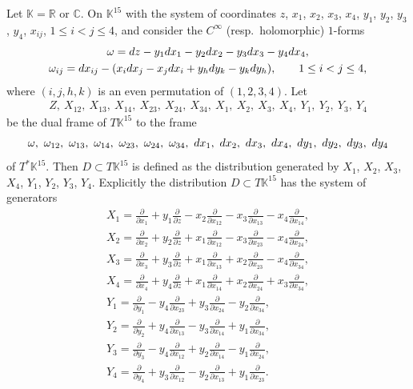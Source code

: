 \documentclass[11pt]{article}
\numberwithin{equation}{section}
\numberwithin{equation}{section}
\theoremstyle{definition}
\newcommand{\R}{\mathbb{R}}
\newcommand{\C}{\mathbb{C}}
\newcommand{\KK}{\mathbb{K}}
\newcommand{\0}{\boldsymbol{0}}
\newcommand{\pa}{\partial}
\begin{document}
Let $\KK = \R$ or $\C$.
On $\KK^{15}$ with the system of coordinates
$z$, $x_1$, $x_2$, $x_3$, $x_4$, $y_1$, $y_2$, $y_3$, $y_4$, $x_{ij}$, $1 \leq i < j \leq 4$, and consider the $C^\infty$ (resp.\ holomorphic) $1$-forms
\begin{gather*}
\omega = {\rm d}z - y_1{\rm d}x_1 - y_2{\rm d}x_2 - y_3{\rm d}x_3 - y_4{\rm d}x_4,
\\
\omega_{ij} =
{\rm d}x_{ij} - (x_i{\rm d}x_j - x_j{\rm d}x_i + y_h{\rm d}y_k - y_k{\rm d}y_h), \qquad 1 \leq i < j \leq 4,
\end{gather*}
where $(i, j, h, k)$ is an even permutation of $(1, 2, 3, 4)$.
Let
\begin{gather*}
Z,\ X_{12},\ X_{13},\ X_{14},\ X_{23},\ X_{24},\ X_{34},\ X_1,\ X_2,\ X_3,\ X_4,\ Y_1,\ Y_2,\ Y_3,\ Y_4
\end{gather*}
be the dual frame of $T\KK^{15}$ to the frame
\[
\omega,\ \omega_{12},\ \omega_{13},\ \omega_{14},\ \omega_{23},\ \omega_{24},\ \omega_{34},\
{\rm d}x_1,\ {\rm d}x_2,\ {\rm d}x_3,\ {\rm d}x_4,\ {\rm d}y_1,\ {\rm d}y_2,\ {\rm d}y_3,\ {\rm d}y_4
\]
of $T^*\KK^{15}$.
Then $D \subset T\KK^{15}$ is defined as the distribution generated by $X_1$, $X_2$, $X_3$, $X_4$, $Y_1$, $Y_2$, $Y_3$, $Y_4$.
Explicitly the distribution $D \subset T\KK^{15}$ has the system of generators
\begin{gather*}
X_1 = \frac{\pa}{\pa x_1} + y_1\frac{\pa}{\pa z} - x_2\frac{\pa}{\pa x_{12}} - x_3\frac{\pa}{\pa x_{13}} -
x_4\frac{\pa}{\pa x_{14}},
\\
X_2 = \frac{\pa}{\pa x_2} + y_2\frac{\pa}{\pa z} + x_1\frac{\pa}{\pa x_{12}} - x_3\frac{\pa}{\pa x_{23}} -
x_4\frac{\pa}{\pa x_{24}},
\\
X_3 = \frac{\pa}{\pa x_3} + y_3\frac{\pa}{\pa z} + x_1\frac{\pa}{\pa x_{13}} + x_2\frac{\pa}{\pa x_{23}} -
x_4\frac{\pa}{\pa x_{34}},
\\
X_4 = \frac{\pa}{\pa x_4} + y_4\frac{\pa}{\pa z} + x_1\frac{\pa}{\pa x_{14}} + x_2\frac{\pa}{\pa x_{24}} +
x_3\frac{\pa}{\pa x_{34}},
\\
Y_1 = \frac{\pa}{\pa y_1} - y_4\frac{\pa}{\pa x_{23}} + y_3\frac{\pa}{\pa x_{24}} - y_2\frac{\pa}{\pa x_{34}},
\\
Y_2 = \frac{\pa}{\pa y_2} + y_4\frac{\pa}{\pa x_{13}} - y_3\frac{\pa}{\pa x_{14}} + y_1\frac{\pa}{\pa x_{34}},
\\
Y_3 = \frac{\pa}{\pa y_3} - y_4\frac{\pa}{\pa x_{12}} + y_2\frac{\pa}{\pa x_{14}} - y_1\frac{\pa}{\pa x_{24}},
\\
Y_4 = \frac{\pa}{\pa y_4} + y_3\frac{\pa}{\pa x_{12}} - y_2\frac{\pa}{\pa x_{13}} + y_1\frac{\pa}{\pa x_{23}}.
\end{gather*}
\end{document}
